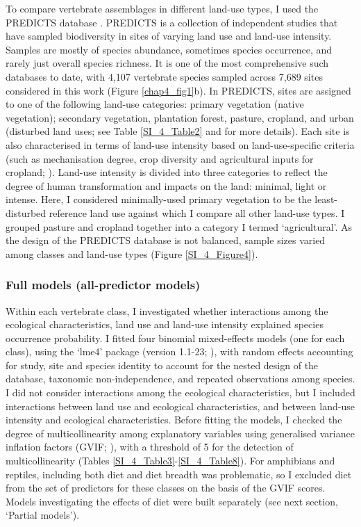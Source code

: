 To compare vertebrate assemblages in different land-use types, I used the PREDICTS database \citep{Hudson2014, Hudson2017}. PREDICTS is a collection of independent studies that have sampled biodiversity in sites of varying land use and land-use intensity. Samples are mostly of species abundance, sometimes species occurrence, and rarely just overall species richness. It is one of the most comprehensive such databases to date, with 4,107 vertebrate species sampled across 7,689 sites considered in this work (Figure \ref{chap4_fig1}b). In PREDICTS, sites are assigned to one of the following land-use categories: primary vegetation (native vegetation); secondary vegetation, plantation forest, pasture, cropland, and urban (disturbed land uses; see Table \ref{SI_4_Table2} and \citet{Hudson2014, Hudson2017} for more details). Each site is also characterised in terms of land-use intensity based on land-use-specific criteria (such as mechanisation degree, crop diversity and agricultural inputs for cropland; \citet{Hudson2014}). Land-use intensity is divided into three categories to reflect the degree of human transformation and impacts on the land: minimal, light or intense. Here, I considered minimally-used primary vegetation to be the least-disturbed reference land use against which I compare all other land-use types. I grouped pasture and cropland together into a category I termed `agricultural'. As the design of the PREDICTS database is not balanced, sample sizes varied among classes and land-use types (Figure \ref{SI_4_Figure4}).

\subsubsection{Full models (all-predictor models)}

Within each vertebrate class, I investigated whether interactions among the ecological characteristics, land use and land-use intensity explained species occurrence probability. I fitted four binomial mixed-effects models (one for each class), using the `lme4' package (version 1.1-23; \citet{Bates2015}), with random effects accounting for study, site and species identity to account for the nested design of the database, taxonomic non-independence, and repeated observations among species. I did not consider interactions among the ecological characteristics, but I included interactions between land use and ecological characteristics, and between land-use intensity and ecological characteristics. Before fitting the models, I checked the degree of multicollinearity among explanatory variables using generalised variance inflation factors (GVIF; \citet{Fox1992}), with a threshold of 5 for the detection of multicollinearity (Tables \ref{SI_4_Table3}-\ref{SI_4_Table8}). For amphibians and reptiles, including both diet and diet breadth was problematic, so I excluded diet from the set of predictors for these classes on the basis of the GVIF scores. Models investigating the effects of diet were built separately (see next section, `Partial models').

